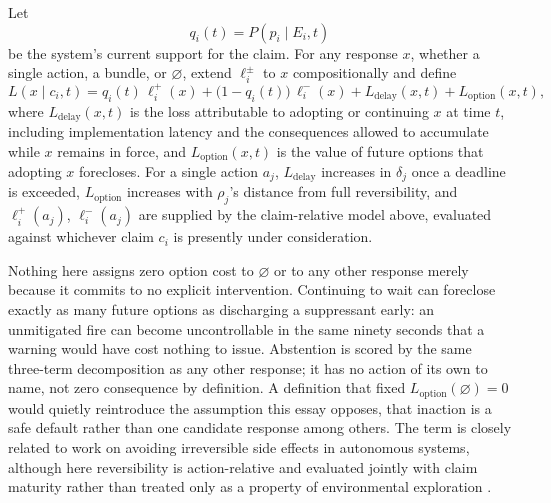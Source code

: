 \documentclass[11pt]{article}
\begin{document}
Let
\[
q_i(t) = P(p_i \mid E_i, t)
\]
be the system's current support for the claim. For any response $x$, whether a single action, a bundle, or $\varnothing$, extend $\ell_i^{\pm}$ to $x$ compositionally and define
\[
L(x \mid c_i, t) = q_i(t)\, \ell_i^{+}(x) + \bigl(1 - q_i(t)\bigr)\, \ell_i^{-}(x) + L_{\mathrm{delay}}(x, t) + L_{\mathrm{option}}(x, t),
\]
where $L_{\mathrm{delay}}(x,t)$ is the loss attributable to adopting or continuing $x$ at time $t$, including implementation latency and the consequences allowed to accumulate while $x$ remains in force, and $L_{\mathrm{option}}(x,t)$ is the value of future options that adopting $x$ forecloses. For a single action $a_j$, $L_{\mathrm{delay}}$ increases in $\delta_j$ once a deadline is exceeded, $L_{\mathrm{option}}$ increases with $\rho_j$'s distance from full reversibility, and $\ell_i^{+}(a_j)$, $\ell_i^{-}(a_j)$ are supplied by the claim-relative model above, evaluated against whichever claim $c_i$ is presently under consideration.

Nothing here assigns zero option cost to $\varnothing$ or to any other response merely because it commits to no explicit intervention. Continuing to wait can foreclose exactly as many future options as discharging a suppressant early: an unmitigated fire can become uncontrollable in the same ninety seconds that a warning would have cost nothing to issue. Abstention is scored by the same three-term decomposition as any other response; it has no action of its own to name, not zero consequence by definition. A definition that fixed $L_{\mathrm{option}}(\varnothing) = 0$ would quietly reintroduce the assumption this essay opposes, that inaction is a safe default rather than one candidate response among others. The term is closely related to work on avoiding irreversible side effects in autonomous systems, although here reversibility is action-relative and evaluated jointly with claim maturity rather than treated only as a property of environmental exploration \cite{AmodeiEtAl2016}.
\end{document}
